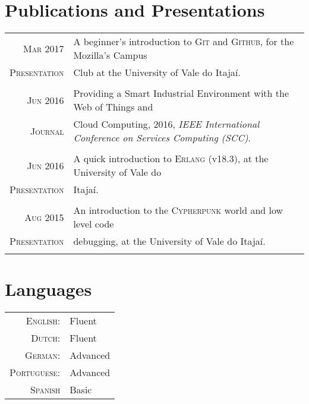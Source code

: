 \documentclass[a4paper,10pt]{article}
\begin{document}
\section{Publications and Presentations}
\begin{tabular}{r|p{11cm}}

\textsc{Mar} 2017 & A beginner's introduction to \textsc{Git} and \textsc{Github}, for the Mozilla's Campus \\\textsc{Presentation} & Club at the University of Vale do Itajaí. \normalsize \\\multicolumn{2}{c}{} \\

\textsc{Jun} 2016 & Providing a Smart Industrial Environment with the Web of Things and \\\textsc{Journal} & Cloud Computing, 2016, \textit{IEEE International Conference on Services Computing (SCC)}. \normalsize \\\multicolumn{2}{c}{} \\

\textsc{Jun} 2016 & A quick introduction to \textsc{Erlang} (v18.3), at the University of Vale do \\\textsc{Presentation} & Itajaí.\normalsize \\\multicolumn{2}{c}{} \\

\textsc{Aug} 2015 & An introduction to the \textsc{Cypherpunk} world and low level code \\\textsc{Presentation} & debugging, at the University of Vale do Itajaí. \normalsize \\\multicolumn{2}{c}{} \\



\end{tabular}

\section{Languages}
\begin{tabular}{rp{12cm}}
\textsc{English:} & Fluent \\
\textsc{Dutch:} & Fluent \\
\textsc{German:} & Advanced \\
\textsc{Portuguese:} & Advanced \\
\textsc{Spanish} & Basic
\end{tabular}
\end{document}
